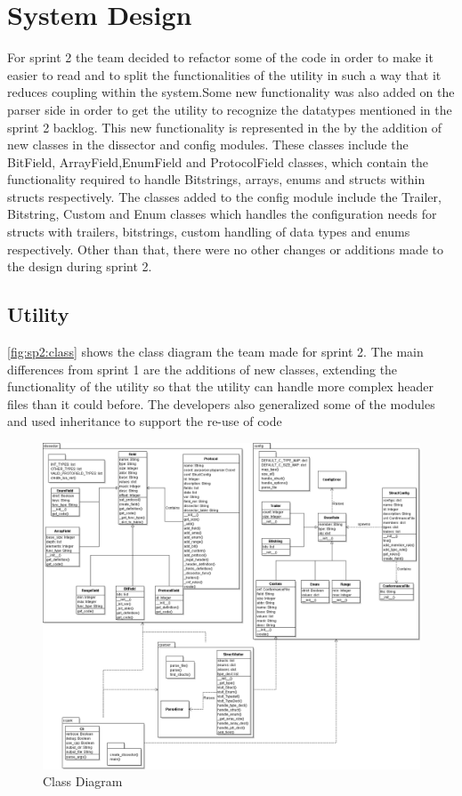 \section{System Design}
For sprint 2 the team decided to refactor some of the code in order to make it easier to read and to split the functionalities of the utility in such a way that it reduces coupling within the system.Some new functionality was also added on the parser side in order to get the utility to recognize the datatypes mentioned in the sprint 2 backlog. This new functionality is represented in the by the addition of new classes in the dissector and config modules. These classes include the BitField, ArrayField,EnumField and ProtocolField classes, which contain the functionality required to handle Bitstrings, arrays, enums and structs within structs respectively. The classes added to the config module include the Trailer, Bitstring, Custom and Enum classes which handles the configuration needs for structs with trailers, bitstrings, custom handling of data types and enums respectively. Other than that, there were no other changes or additions made to the design during sprint 2.

\subsection{Utility}
\autoref{fig:sp2:class} shows the class diagram the team made for sprint 2. The main differences from sprint 1 are the additions of new classes, extending the functionality of the utility so that the utility can handle more complex header files than it could before. The developers also generalized some of the modules and used inheritance to support the re-use of code 
\begin{figure}[!htb]
	\center
	\includegraphics[width=\textwidth]{./sprints/img/class_diagram_s2}
	\caption{Class Diagram\label{fig:sp2:class}}
\end{figure}



